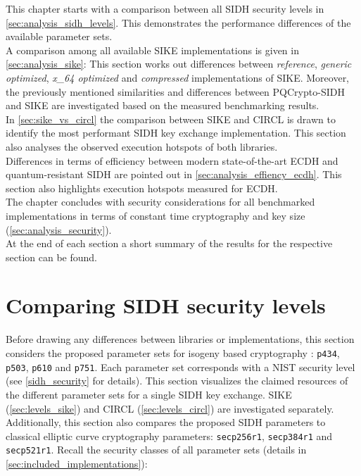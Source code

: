 This chapter starts with a comparison between all \gls{SIDH} security levels in \autoref{sec:analysis_sidh_levels}. This demonstrates the performance differences of the available parameter sets. \\
A comparison among all available \gls{SIKE} implementations is given in \autoref{sec:analysis_sike}: This section  works out differences between \textit{reference}, \textit{generic optimized}, \textit{x\_64 optimized} and \textit{compressed} implementations of SIKE. Moreover, the previously mentioned similarities and differences between \gls{PQCrypto-SIDH} and \gls{SIKE} are investigated based on the measured benchmarking results. \\
In \autoref{sec:sike_vs_circl} the comparison between \gls{SIKE} and \gls{CIRCL} is drawn to identify the most performant SIDH key exchange implementation. This section also analyses the observed execution hotspots of both libraries.\\
Differences in terms of efficiency between modern state-of-the-art \gls{ECDH} and quantum-resistant \gls{SIDH} are pointed out in \autoref{sec:analysis_effiency_ecdh}. This section also highlights execution hotspots measured for \gls{ECDH}.\\
The chapter concludes with security considerations for all benchmarked implementations in terms of constant time cryptography and key size (\autoref{sec:analysis_security}).\\
At the end of each section a short summary of the results for the respective section can be found. 

\section{Comparing \gls{SIDH} security levels}\label{sec:analysis_sidh_levels}
Before drawing any differences between libraries or implementations, this section considers the proposed parameter sets for isogeny based cryptography \parencite{sike2020spec}: \texttt{p434}, \texttt{p503}, \texttt{p610} and \texttt{p751}. Each parameter set  corresponds with a  \gls{NIST} security level (see \autoref{sidh_security} for details). This section visualizes the claimed resources of the different parameter sets for a single \gls{SIDH} key exchange. \gls{SIKE} (\autoref{sec:levels_sike}) and \gls{CIRCL} (\autoref{sec:levels_circl}) are investigated separately. Additionally, this section also compares the proposed \gls{SIDH} parameters to classical elliptic curve cryptography parameters: \texttt{secp256r1}, \texttt{secp384r1} and \texttt{secp521r1}. Recall the security classes of all parameter sets (details in \autoref{sec:included_implementations}):

